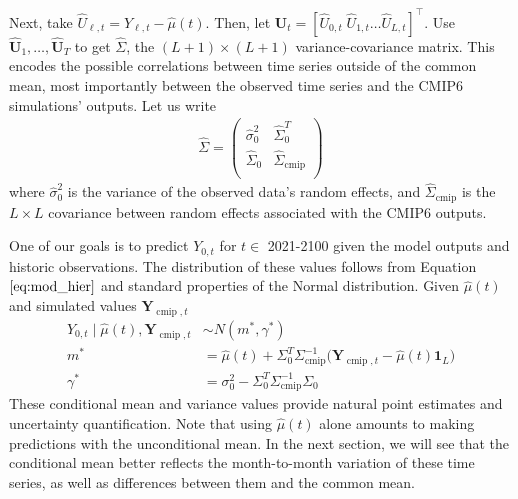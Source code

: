 \documentclass{CUP-JNL-EDS}
\begin{document}
Next, take $\hat{U}_{\ell,t} = Y_{\ell,t} - \hat{\mu}(t)$. Then, let $\hat{\bm{U}}_t = [ \hat{U}_{0,t} \; \hat{U}_{1,t} \dots \hat{U}_{L,t}]^\top $.
Use $\hat{\bm{U}}_1,\dots,\hat{\bm{U}}_T$ to get $\hat{\Sigma}$, the $(L+1) \times (L +1)$ variance-covariance matrix. This encodes the possible correlations between time series outside of the common mean, most importantly between the observed time series and the CMIP6 simulations' outputs. Let us write 
\begin{align} \label{eq:sigma_hat}
    \hat{\Sigma} = \left(   \begin{array}{ll} 
    \hat{\sigma}_{0}^{2} & \hat{\Sigma}_{0}^{T} \\
    \hat{\Sigma}_{0} & \hat{\Sigma}_{\operatorname{cmip}} \\
    \end{array}
    \right)
\end{align}
where $\hat{\sigma}_{0}^{2}$ is the variance of the observed data's random effects, and $\hat{\Sigma}_{\operatorname{cmip}}$ is the $L \times L$ covariance between random effects associated with the CMIP6 outputs.

One of our goals is to predict $Y_{0, t}$ for $t \in $ 2021-2100 given the model outputs and historic observations. The distribution of these values follows from Equation $\ref{eq:mod_hier}$ and standard properties of the Normal distribution. Given $\hat{\mu}(t)$ and simulated values $\bm{Y}_{\operatorname{cmip},t}$%
\begin{align}
        Y_{0,t} \mid  \hat{\mu}(t), \bm{Y}_{\operatorname{cmip},t} &\sim N(m^*, \gamma^*) \label{eq:cond_pred_y} \\
        m^* &=  \hat{\mu}(t) + \Sigma_{0}^{T} \Sigma_{\operatorname{cmip}}^{-1} \bigl( \bm{Y}_{\operatorname{cmip}, t} - \hat{\mu}(t)\bm{1}_L \bigr) \label{eq:cond_pred_mean}\\
        \gamma^* &= \sigma_{0}^{2} - \Sigma_{0}^{T} \Sigma_{\operatorname{cmip}}^{-1}\Sigma_{0} \label{eq:cond_pred_cov}
\end{align}
These conditional mean and variance values provide natural point estimates and uncertainty quantification. Note that using $\hat{\mu}(t)$ alone amounts to making predictions with the unconditional mean. In the next section, we will see that the conditional mean better reflects the month-to-month variation of these time series, as well as differences between them and the common mean.
\end{document}

